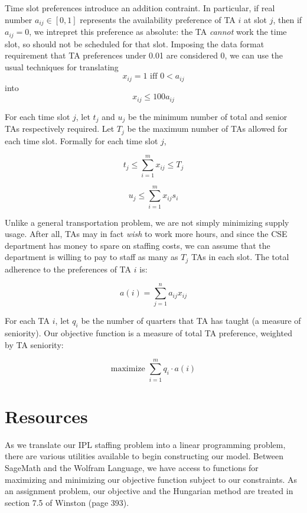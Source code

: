 \documentclass{article}
\begin{document}
\begin{multicols}{2}
Time slot preferences introduce an addition contraint. In particular, if real number $a_{ij} \in [0,1]$ represents the availability preference of TA $i$ at slot $j$, then if $a_{ij} = 0$, we intrepret this preference as absolute: the TA \textit{cannot} work the time slot, so should not be scheduled for that slot. Imposing the data format requirement that TA preferences under 0.01 are considered 0, we can use the usual techniques for translating
\begin{equation}
x_{ij} = 1 \textrm{ iff } 0 < a_{ij}
\end{equation}
into
\begin{equation}
x_{ij} \leq 100 a_{ij}
\end{equation}

For each time slot $j$, let $t_j$ and $u_j$ be the minimum number of total and senior TAs respectively required. Let $T_j$ be the maximum number of TAs allowed for each time slot. Formally for each time slot $j$,

\begin{equation}
t_j \leq \sum_{i=1}^{m}x_{ij} \leq T_j
\end{equation}

\begin{equation}
u_j \leq \sum_{i=1}^{m}x_{ij}s_i
\end{equation}

Unlike a general transportation problem, we are not simply minimizing supply usage. After all, TAs may in fact \textit{wish} to work more hours, and since the CSE department has money to spare on staffing costs, we can assume that the department is willing to pay to staff as many as $T_j$ TAs in each slot. The total adherence to the preferences of TA $i$ is:

\begin{equation}
a(i) = \sum_{j=1}^na_{ij}x_{ij}
\end{equation}

For each TA $i$, let $q_i$ be the number of quarters that TA has taught (a measure of seniority). Our objective function is a measure of total TA preference, weighted by TA seniority:

\begin{equation}
\textrm{maximize } \sum_{i=1}^mq_i\cdot a(i)
\end{equation}

\section*{Resources}
As we translate our IPL staffing problem into a linear programming problem, there are various utilities available to begin constructing our model. Between SageMath and the Wolfram Language, we have access to functions for maximizing and minimizing our objective function subject to our constraints. As an assignment problem, our objective and the Hungarian method are treated in section 7.5 of Winston (page 393).


\end{multicols}
\end{document}
